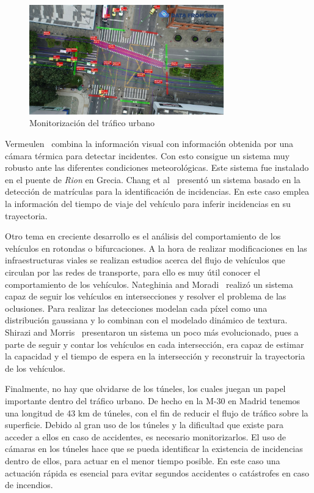 \begin{figure}[H]
  \begin{center}
    \includegraphics[width=0.75\textwidth]{figures/Introduccion/monitorizacion_trafico_urbano.jpg}
		\caption{Monitorización del tráfico urbano}
		\label{fig.monitorizacion_trafico_urbano}
		\end{center}
\end{figure}

Vermeulen~\cite{automatic_incident} combina la información visual con información obtenida por una cámara térmica  para detectar incidentes. Con esto consigue un sistema muy robusto ante las diferentes condiciones meteorológicas. Este sistema fue instalado en el puente de \textit{Rion} en Grecia. Chang et al~\cite{new_traffic_incident} presentó un sistema basado en la detección de matrículas para la identificación de incidencias. En este caso emplea la información del tiempo de viaje del vehículo para inferir incidencias en su trayectoria.

Otro tema en creciente desarrollo es el análisis del comportamiento de los vehículos en rotondas o bifurcaciones. A la hora de realizar modificaciones en las infraestructuras viales se realizan estudios acerca del flujo de vehículos que circulan por las redes de transporte, para ello es muy útil conocer el comportamiento de los vehículos. Nateghinia and Moradi~\cite{video_based_multiple} realizó un sistema capaz de seguir los vehículos en intersecciones y resolver el problema de las oclusiones. Para realizar las detecciones modelan cada píxel como una distribución gaussiana y lo combinan con el modelado dinámico de  textura. Shirazi and Morris~\cite{vision_based_turning} presentaron un sistema un poco más evolucionado, pues a parte de seguir y contar los vehículos en cada intersección, era capaz de estimar la capacidad y el tiempo de espera en la intersección y reconstruir la trayectoria de los vehículos.

Finalmente, no hay que olvidarse de los túneles, los cuales juegan un papel importante dentro del tráfico urbano. De hecho en la M-30 en Madrid tenemos una longitud de 43 km de túneles, con el fin de reducir el flujo de tráfico sobre la superficie. Debido al gran uso de los túneles y la dificultad que existe para acceder a ellos en caso de accidentes, es necesario monitorizarlos. El uso de cámaras en los túneles hace que se pueda identificar la existencia de incidencias dentro de ellos, para actuar en el menor tiempo posible. En este caso una actuación rápida es esencial para evitar segundos accidentes o catástrofes en caso de incendios.

